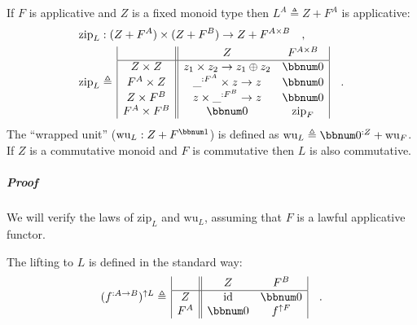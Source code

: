 If $F$ is applicative and $Z$ is a fixed monoid type then $L^{A}\triangleq Z+F^{A}$
is applicative:
\begin{align*}
 & \text{zip}_{L}:(Z+F^{A})\times(Z+F^{B})\rightarrow Z+F^{A\times B}\quad,\\
 & \text{zip}_{L}\triangleq\,\begin{array}{|c||cc|}
 & Z & F^{A\times B}\\
\hline Z\times Z & z_{1}\times z_{2}\rightarrow z_{1}\oplus z_{2} & \bbnum 0\\
F^{A}\times Z & \_^{:F^{A}}\times z\rightarrow z & \bbnum 0\\
Z\times F^{B} & z\times\_^{:F^{B}}\rightarrow z & \bbnum 0\\
F^{A}\times F^{B} & \bbnum 0 & \text{zip}_{F}
\end{array}\quad.
\end{align*}
The \textsf{``}wrapped unit\textsf{''} ($\text{wu}_{L}:Z+F^{\bbnum 1}$) is defined
as $\text{wu}_{L}\triangleq\bbnum 0^{:Z}+\text{wu}_{F}$. If $Z$
is a commutative monoid and $F$ is commutative then $L$ is also
commutative.

\subparagraph{Proof}

We will verify the laws of $\text{zip}_{L}$ and $\text{wu}_{L}$,
assuming that $F$ is a lawful applicative functor.

The lifting to $L$ is defined in the standard way:
\[
(f^{:A\rightarrow B})^{\uparrow L}\triangleq\,\begin{array}{|c||cc|}
 & Z & F^{B}\\
\hline Z & \text{id} & \bbnum 0\\
F^{A} & \bbnum 0 & f^{\uparrow F}
\end{array}\quad.
\]

